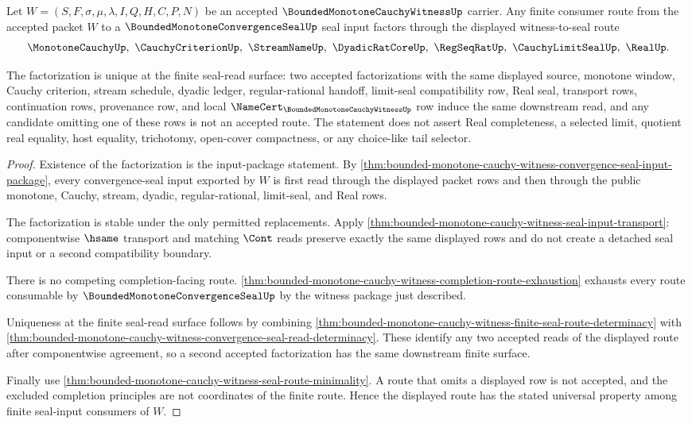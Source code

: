 \begin{theorem}
\label{thm:bounded-monotone-cauchy-witness-seal-route-universal-property}
Let $W=(S,F,\sigma,\mu,\lambda,I,Q,H,C,P,N)$ be an accepted $\BoundedMonotoneCauchyWitnessUp$ carrier. Any finite consumer route from the accepted packet $W$ to a $\BoundedMonotoneConvergenceSealUp$ seal input factors through the displayed witness-to-seal route
$$
\MonotoneCauchyUp,\ \CauchyCriterionUp,\ \StreamNameUp,\ \DyadicRatCoreUp,\ \RegSeqRatUp,\ \CauchyLimitSealUp,\ \RealUp .
$$

The factorization is unique at the finite seal-read surface: two accepted factorizations with the same displayed source, monotone window, Cauchy criterion, stream schedule, dyadic ledger, regular-rational handoff, limit-seal compatibility row, Real seal, transport rows, continuation rows, provenance row, and local $\NameCert_{\BoundedMonotoneCauchyWitnessUp}$ row induce the same downstream read, and any candidate omitting one of these rows is not an accepted route. The statement does not assert Real completeness, a selected limit, quotient real equality, host equality, trichotomy, open-cover compactness, or any choice-like tail selector.
\end{theorem}
\begin{proof}
Existence of the factorization is the input-package statement. By \autoref{thm:bounded-monotone-cauchy-witness-convergence-seal-input-package}, every convergence-seal input exported by $W$ is first read through the displayed packet rows and then through the public monotone, Cauchy, stream, dyadic, regular-rational, limit-seal, and Real rows.

The factorization is stable under the only permitted replacements. Apply \autoref{thm:bounded-monotone-cauchy-witness-seal-input-transport}: componentwise $\hsame$ transport and matching $\Cont$ reads preserve exactly the same displayed rows and do not create a detached seal input or a second compatibility boundary.

There is no competing completion-facing route. \autoref{thm:bounded-monotone-cauchy-witness-completion-route-exhaustion} exhausts every route consumable by $\BoundedMonotoneConvergenceSealUp$ by the witness package just described.

Uniqueness at the finite seal-read surface follows by combining \autoref{thm:bounded-monotone-cauchy-witness-finite-seal-route-determinacy} with \autoref{thm:bounded-monotone-cauchy-witness-convergence-seal-read-determinacy}. These identify any two accepted reads of the displayed route after componentwise agreement, so a second accepted factorization has the same downstream finite surface.

Finally use \autoref{thm:bounded-monotone-cauchy-witness-seal-route-minimality}. A route that omits a displayed row is not accepted, and the excluded completion principles are not coordinates of the finite route. Hence the displayed route has the stated universal property among finite seal-input consumers of $W$.
\end{proof}

